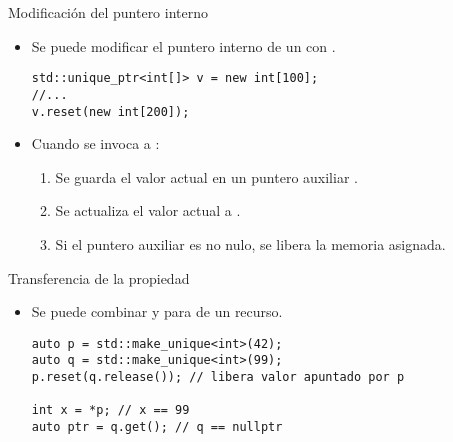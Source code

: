 \begin{frame}[t,fragile]{Modificación del puntero interno}
\begin{itemize}
  \item Se puede modificar el puntero interno de un 
        con .
\begin{lstlisting}
std::unique_ptr<int[]> v = new int[100];
//...
v.reset(new int[200]);
\end{lstlisting}

  \item Cuando se invoca a :
    \begin{enumerate}
      \item Se guarda el valor actual en un puntero auxiliar .
      \item Se actualiza el valor actual a .
      \item Si el puntero auxiliar es no nulo, se libera la memoria asignada.
    \end{enumerate}
\end{itemize}
\end{frame}

\begin{frame}[t,fragile]{Transferencia de la propiedad}
\begin{itemize}
  \item Se puede combinar  y  para 
         de un recurso.
\begin{lstlisting}
auto p = std::make_unique<int>(42);
auto q = std::make_unique<int>(99);
p.reset(q.release()); // libera valor apuntado por p

int x = *p; // x == 99
auto ptr = q.get(); // q == nullptr
\end{lstlisting}
\end{itemize}
\end{frame}

